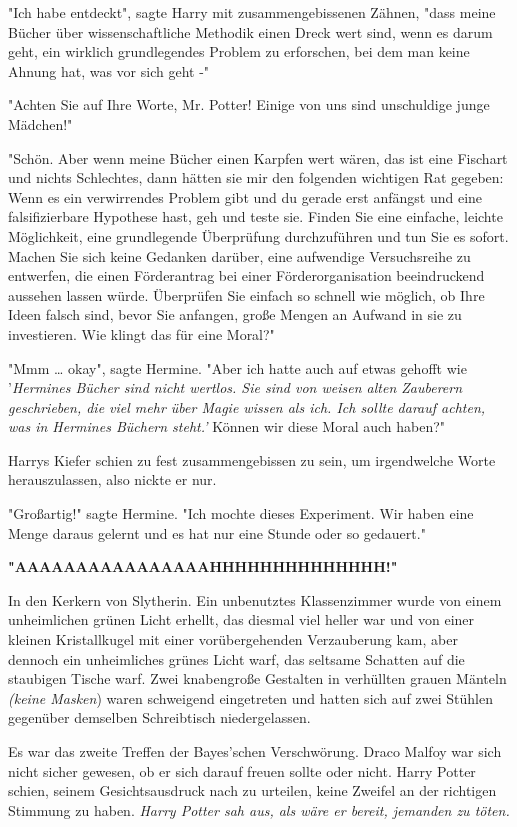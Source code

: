 {"Ich habe entdeckt", sagte Harry mit zusammengebissenen Zähnen, "dass meine Bücher über wissenschaftliche Methodik einen Dreck wert sind, wenn es darum geht, ein wirklich grundlegendes Problem zu erforschen, bei dem man keine Ahnung hat, was vor sich geht -"

"Achten Sie auf Ihre Worte, Mr. Potter! Einige von uns sind unschuldige junge Mädchen!"

"Schön. Aber wenn meine Bücher einen Karpfen wert wären, das ist eine Fischart und nichts Schlechtes, dann hätten sie mir den folgenden wichtigen Rat gegeben: Wenn es ein verwirrendes Problem gibt und du gerade erst anfängst und eine falsifizierbare Hypothese hast, geh und teste sie. Finden Sie eine einfache, leichte Möglichkeit, eine grundlegende Überprüfung durchzuführen und tun Sie es sofort. Machen Sie sich keine Gedanken darüber, eine aufwendige Versuchsreihe zu entwerfen, die einen Förderantrag bei einer Förderorganisation beeindruckend aussehen lassen würde. Überprüfen Sie einfach so schnell wie möglich, ob Ihre Ideen falsch sind, bevor Sie anfangen, große Mengen an Aufwand in sie zu investieren. Wie klingt das für eine Moral?"

"Mmm … okay", sagte Hermine. "Aber ich hatte auch auf etwas gehofft wie '\emph{Hermines Bücher sind nicht wertlos. Sie sind von weisen alten Zauberern geschrieben, die viel mehr über Magie wissen als ich. Ich sollte darauf achten, was in Hermines Büchern steht.'} Können wir diese Moral auch haben?"

Harrys Kiefer schien zu fest zusammengebissen zu sein, um irgendwelche Worte herauszulassen, also nickte er nur.

"Großartig!" sagte Hermine. "Ich mochte dieses Experiment. Wir haben eine Menge daraus gelernt und es hat nur eine Stunde oder so gedauert."

\textbf{"AAAAAAAAAAAAAAAAHHHHHHHHHHHHHH!"}

In den Kerkern von Slytherin. Ein unbenutztes Klassenzimmer wurde von einem unheimlichen grünen Licht erhellt, das diesmal viel heller war und von einer kleinen Kristallkugel mit einer vorübergehenden Verzauberung kam, aber dennoch ein unheimliches grünes Licht warf, das seltsame Schatten auf die staubigen Tische warf. Zwei knabengroße Gestalten in verhüllten grauen Mänteln \emph{(keine Masken}) waren schweigend eingetreten und hatten sich auf zwei Stühlen gegenüber demselben Schreibtisch niedergelassen.

Es war das zweite Treffen der Bayes'schen Verschwörung. Draco Malfoy war sich nicht sicher gewesen, ob er sich darauf freuen sollte oder nicht. Harry Potter schien, seinem Gesichtsausdruck nach zu urteilen, keine Zweifel an der richtigen Stimmung zu haben. \emph{Harry Potter sah aus, als wäre er bereit, jemanden zu töten.}

}

